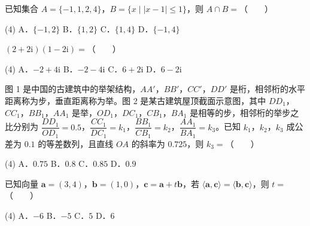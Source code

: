 \begin{question}
已知集合 $A=\{-1,1,2,4\}$，$B=\{x\mid|x-1|\le1\}$，则 $A\cap B=$（　　）

\begin{gkopts}(4)
\task A．$\{-1,2\}$
\task B．$\{1,2\}$
\task C．$\{1,4\}$
\task D．$\{-1,4\}$
\end{gkopts}

\end{question}
\begin{question}
$(2+2\mathrm i)(1-2\mathrm i)=$（　　）

\begin{gkopts}(4)
\task A．$-2+4\mathrm i$
\task B．$-2-4\mathrm i$
\task C．$6+2\mathrm i$
\task D．$6-2\mathrm i$
\end{gkopts}

\Needspace{0.4\textheight}
\end{question}
\begin{question}
图 1 是中国的古建筑中的举架结构，$AA'$，$BB'$，$CC'$，$DD'$ 是桁，相邻桁的水平距离称为步，垂直距离称为举。图 2 是某古建筑屋顶截面示意图，其中 $DD_1$，$CC_1$，$BB_1$，$AA_1$ 是举，$OD_1$，$DC_1$，$CB_1$，$BA_1$ 是相等的步，相邻桁的举步之比分别为 $\dfrac{DD_1}{OD_1}=0.5$，$\dfrac{CC_1}{DC_1}=k_1$，$\dfrac{BB_1}{CB_1}=k_2$，$\dfrac{AA_1}{BA_1}=k_3$。已知 $k_1$，$k_2$，$k_3$ 成公差为 $0.1$ 的等差数列，且直线 $OA$ 的斜率为 $0.725$，则 $k_3=$（　　）
\nopagebreak[4]
\begin{center}\end{center}
\nopagebreak[4]
\nopagebreak[4]
\begin{center}\end{center}
\nopagebreak[4]
\begin{gkopts}(4)
\task A．$0.75$
\task B．$0.8$
\task C．$0.85$
\task D．$0.9$
\end{gkopts}

\end{question}
\begin{question}
已知向量 $\boldsymbol a=(3,4)$，$\boldsymbol b=(1,0)$，$\boldsymbol c=\boldsymbol a+t\boldsymbol b$，若 $\langle\boldsymbol a,\boldsymbol c\rangle=\langle\boldsymbol b,\boldsymbol c\rangle$，则 $t=$（　　）

\begin{gkopts}(4)
\task A．$-6$
\task B．$-5$
\task C．$5$
\task D．$6$
\end{gkopts}

\end{question}
